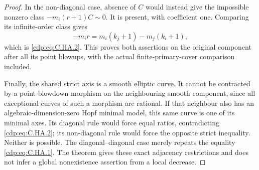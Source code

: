 \begin{proof}
In the non-diagonal case, absence of $C$ would instead
give the impossible nonzero class $-m_i(r+1)C\sim0$.
It is present, with coefficient one. Comparing its
infinite-order class gives
\[
       -m_i r=m_i(k_j+1)-m_j(k_i+1),
\tag{C.HA.6}\label{cdp:eq:C.HA.6}
\]
which is \eqref{cdp:eq:C.HA.2}. This proves both assertions on the
original component after all its point blowups, with
the actual finite-primary-cover comparison included.

Finally, the shared strict axis is a smooth elliptic
curve. It cannot be contracted by a point-blowdown
morphism on the neighbouring smooth component, since
all exceptional curves of such a morphism are rational.
If that neighbour also has an algebraic-dimension-zero
Hopf minimal model, this same curve is one of its
minimal axes. Its diagonal rule would force equal
ratios, contradicting \eqref{cdp:eq:C.HA.2}; its non-diagonal rule
would force the opposite strict inequality. Neither
is possible. The diagonal--diagonal case merely repeats
the equality \eqref{cdp:eq:C.HA.1}. The theorem gives these exact
adjacency restrictions and does not infer a global
nonexistence assertion from a local decrease.
\end{proof}


